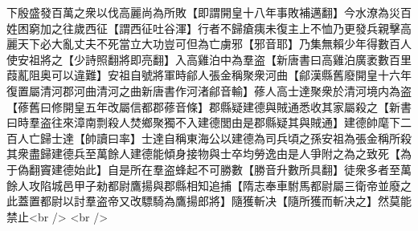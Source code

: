 下殷盛發百萬之衆以伐高麗尚為所敗【即謂開皇十八年事敗補邁翻】今水潦為災百姓困窮加之往歲西征【謂西征吐谷渾】行者不歸瘡痍未復主上不恤乃更發兵親擊高麗天下必大亂丈夫不死當立大功豈可但為亡虜邪【邪音耶】乃集無賴少年得數百人使安祖將之【少詩照翻將即亮翻】入高雞泊中為羣盗【新唐書曰高雞泊廣袤數百里葭薍阻奥可以違難】安祖自號將軍時鄃人張金稱聚衆河曲【鄃漢縣舊廢開皇十六年復置屬清河郡河曲清河之曲新唐書作河渚鄃音輸】蓚人高士達聚衆於清河境内為盗【蓚舊曰修開皇五年改屬信都郡蓚音條】郡縣疑建德與賊通悉收其家屬殺之【新書曰時羣盗往來漳南剽殺人焚鄉聚獨不入建德閭由是郡縣疑其與賊通】建德帥麾下二百人亡歸士達【帥讀曰率】士達自稱東海公以建德為司兵頃之孫安祖為張金稱所殺其衆盡歸建德兵至萬餘人建德能傾身接物與士卒均勞逸由是人爭附之為之致死【為于偽翻竇建德始此】自是所在羣盗蜂起不可勝數【勝音升數所具翻】徒衆多者至萬餘人攻陷城邑甲子勑都尉鷹揚與郡縣相知追捕【隋志奉車駙馬都尉屬三衛帝並廢之此蓋置都尉以討羣盗帝又改驃騎為鷹揚郎將】隨獲斬决【隨所獲而斬决之】然莫能禁止<br />
<br />
